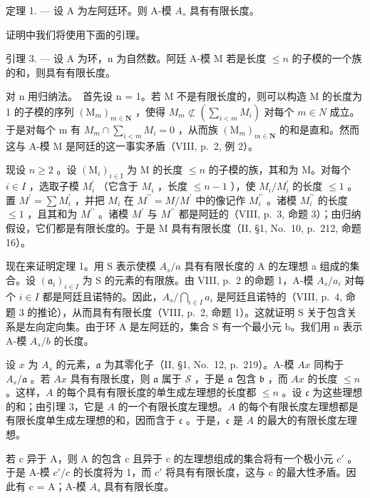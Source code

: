 定理 1. --- 设 A 为左阿廷环。则 A-模 \(A_{s}\) 具有有限长度。

证明中我们将使用下面的引理。

引理 3. --- 设 A 为环，n 为自然数。阿廷 A-模 M 若是长度 \(\leqslant n\) 的子模的一个族的和，则具有有限长度。

对 n 用归纳法。~首先设 n = 1。若 M 不是有限长度的，则可以构造 M 的长度为 1 的子模的序列 \((\mathrm{M}_{m})_{m \in \mathbf{N}}\) ，使得 \(M_{m} \not\subset (\sum_{i < m} M_{i})\) 对每个 \(m \in N\) 成立。于是对每个 m 有 \(M_{m} \cap \sum_{i < m} M_{i} = 0\) ，从而族 \((\mathrm{M}_{m})_{m \in \mathbf{N}}\) 的和是直和。然而这与 A-模 M 是阿廷的这一事实矛盾（VIII, p.~2, 例 2）。

现设 \(n \geqslant 2\) 。设 \((\mathrm{M}_{i})_{i \in \mathrm{I}}\) 为 M 的长度 \(\leqslant n\) 的子模的族，其和为 M。对每个 \(i \in I\) ，选取子模 \(M_{i}^{\prime}\) （它含于 \(M_{i}\) ，长度 \(\leqslant n - 1\) ），使 \(M_{i}/M_{i}^{\prime}\) 的长度 \(\leqslant 1\) 。置 \(M^{\prime} = \sum M_{i}^{\prime}\) ，并把 \(M_{i}\) 在 \(M^{\prime\prime} = M/M^{\prime}\) 中的像记作 \(M_{i}^{\prime\prime}\) 。诸模 \(M_{i}^{\prime\prime}\) 的长度 \(\leqslant 1\) ，且其和为 \(M^{\prime\prime}\) 。诸模 \(M^{\prime}\) 与 \(M^{\prime\prime}\) 都是阿廷的（VIII, p.~3, 命题 3）；由归纳假设，它们都是有限长度的。于是 M 具有有限长度（II, §1, No.~10, p.~212, 命题 16）。

现在来证明定理 1。用 S 表示使模 \(A_{s}/a\) 具有有限长度的 A 的左理想 a 组成的集合。设 \((\mathfrak{a}_{i})_{i\in I}\) 为 S 的元素的有限族。由 VIII, p.~2 的命题 1，A-模 \(A_{s}/a_{i}\) 对每个 \(i\in I\) 都是阿廷且诺特的。因此，\(A_{s}/\bigcap_{i\in I}a_{i}\) 是阿廷且诺特的（VIII, p.~4, 命题 3 的推论），从而具有有限长度（VIII, p.~2, 命题 1）。这就证明 S 关于包含关系是左向定向集。由于环 A 是左阿廷的，集合 S 有一个最小元 b。我们用 n 表示 A-模 \(A_{s}/b\) 的长度。

设 \(x\) 为 \(A_s\) 的元素，\(\mathfrak{a}\) 为其零化子（II, §1, No.~12, p.~219）。A-模 \(Ax\) 同构于 \(A_s / \mathfrak{a}\) 。若 \(Ax\) 具有有限长度，则 \(\mathfrak{a}\) 属于 \(\mathscr{S}\) ，于是 \(\mathfrak{a}\) 包含 \(\mathfrak{b}\) ，而 \(Ax\) 的长度 \(\leqslant n\) 。这样，\(A\) 的每个具有有限长度的单生成左理想的长度都 \(\leqslant n\) 。设 \(\mathfrak{c}\) 为这些理想的和；由引理 3，它是 \(A\) 的一个有限长度左理想。\(A\) 的每个有限长度左理想都是有限长度单生成左理想的和，因而含于 \(\mathfrak{c}\) 。于是，\(\mathfrak{c}\) 是 \(A\) 的最大的有限长度左理想。

若 c 异于 A，则 A 的包含 c 且异于 c 的左理想组成的集合将有一个极小元 \(c'\) 。于是 A-模 \(c'/c\) 的长度将为 1，而 \(c'\) 将具有有限长度，这与 c 的最大性矛盾。因此有 c = A；A-模 \(A_{s}\) 具有有限长度。

